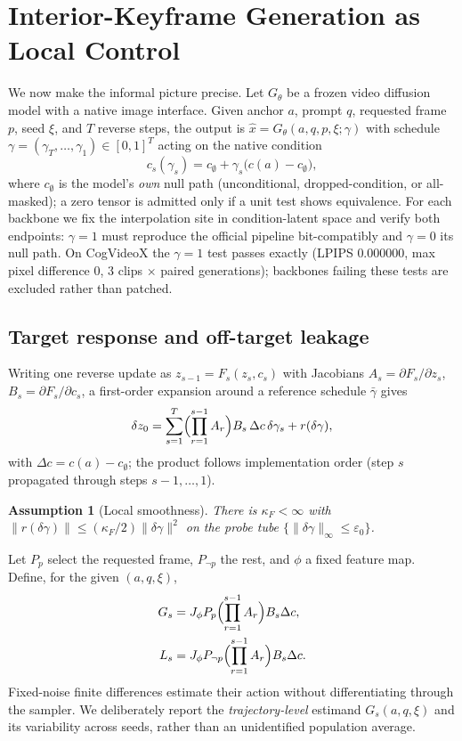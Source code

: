 \documentclass[letterpaper]{article}
\newtheorem{assumption}{Assumption}
\begin{document}
\section{Interior-Keyframe Generation as Local Control}
\label{sec:form}
We now make the informal picture precise.
Let $G_\theta$ be a frozen video diffusion model with a native image
interface. Given anchor $a$, prompt $q$, requested frame $p$, seed $\xi$,
and $T$ reverse steps, the output is
$\hat x=G_\theta(a,q,p,\xi;\gamma)$ with schedule
$\gamma=(\gamma_T,\ldots,\gamma_1)\in[0,1]^T$ acting on the native
condition
\begin{equation}
c_s(\gamma_s)=c_\emptyset+\gamma_s\bigl(c(a)-c_\emptyset\bigr),
\label{eq:native}
\end{equation}
where $c_\emptyset$ is the model's \emph{own} null path (unconditional,
dropped-condition, or all-masked); a zero tensor is admitted only if a unit
test shows equivalence. For each backbone we fix the interpolation site in
condition-latent space and verify both endpoints: $\gamma{=}1$ must
reproduce the official pipeline bit-compatibly and $\gamma{=}0$ its null
path. On CogVideoX the $\gamma{=}1$ test passes exactly (LPIPS
$0.000000$, max pixel difference $0$, $3$ clips $\times$ paired
generations); backbones failing these tests are excluded rather than
patched.

\subsection{Target response and off-target leakage}
Writing one reverse update as $z_{s-1}=F_s(z_s,c_s)$ with Jacobians
$A_s=\partial F_s/\partial z_s$, $B_s=\partial F_s/\partial c_s$, a
first-order expansion around a reference schedule $\bar\gamma$ gives
\begin{equation}
\delta z_0=\sum_{s=1}^{T}\Bigl(\prod_{r=1}^{s-1}A_r\Bigr)B_s\,\Delta c\,
\delta\gamma_s+r(\delta\gamma),
\label{eq:linear}
\end{equation}
with $\Delta c=c(a)-c_\emptyset$; the product follows implementation
order (step $s$ propagated through steps $s{-}1,\ldots,1$).
\begin{assumption}[Local smoothness]\label{ass:smooth}
There is $\kappa_F<\infty$ with
$\|r(\delta\gamma)\|\le(\kappa_F/2)\|\delta\gamma\|^2$ on the probe tube
$\{\|\delta\gamma\|_\infty\le\varepsilon_0\}$.
\end{assumption}
Let $P_p$ select the requested frame, $P_{\neg p}$ the rest, and $\phi$ a
fixed feature map. Define, for the given $(a,q,\xi)$,
\begin{equation}
\begin{aligned}
G_s&=J_\phi P_p\Bigl(\prod_{r=1}^{s-1}A_r\Bigr)B_s\Delta c,\\
L_s&=J_\phi P_{\neg p}\Bigl(\prod_{r=1}^{s-1}A_r\Bigr)B_s\Delta c.
\end{aligned}
\label{eq:GL}
\end{equation}
Fixed-noise finite differences estimate their action without
differentiating through the sampler. We deliberately report the
\emph{trajectory-level} estimand $G_s(a,q,\xi)$ and its variability across
seeds, rather than an unidentified population average.
\end{document}

